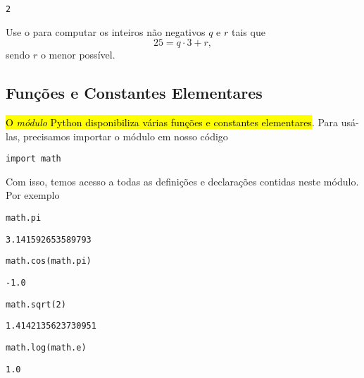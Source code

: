 \documentclass[12pt]{article}
\begin{document}
\begin{verbatim}
2
\end{verbatim}

\begin{exr}
  Use o {\python} para computar os inteiros não negativos $q$ e $r$ tais que
  \begin{equation}
    25 = q\cdot 3 + r,
  \end{equation}
  sendo $r$ o menor possível.
\end{exr}

\subsection{Funções e Constantes Elementares}

\hl{O \emph{módulo} Python {\PYTHONmath} disponibiliza várias funções e constantes elementares}. Para usá-las, precisamos importar o módulo em nosso código

\begin{lstlisting}
import math
\end{lstlisting}

Com isso, temos acesso a todas as definições e declarações contidas neste módulo. Por exemplo

\begin{lstlisting}
math.pi
\end{lstlisting}

\begin{verbatim}
3.141592653589793
\end{verbatim}

\begin{lstlisting}
math.cos(math.pi)
\end{lstlisting}

\begin{verbatim}
-1.0
\end{verbatim}

\begin{lstlisting}
math.sqrt(2)
\end{lstlisting}

\begin{verbatim}
1.4142135623730951
\end{verbatim}

\begin{lstlisting}
math.log(math.e)
\end{lstlisting}

\begin{verbatim}
1.0
\end{verbatim}
\end{document}

